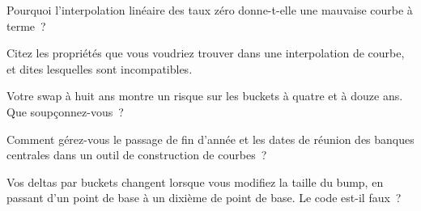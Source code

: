 \begin{interviewq}\label{iq:rc:curve-construction:2}
Pourquoi l'interpolation linéaire des taux zéro donne-t-elle une mauvaise courbe à terme~?
\end{interviewq}

\begin{interviewq}\label{iq:rc:curve-construction:3}
Citez les propriétés que vous voudriez trouver dans une interpolation de courbe, et dites lesquelles
sont incompatibles.
\end{interviewq}

\begin{interviewq}\label{iq:rc:curve-construction:4}
Votre swap à huit ans montre un risque sur les buckets à quatre et à douze ans. Que
soupçonnez-vous~?
\end{interviewq}

\begin{interviewq}\label{iq:rc:curve-construction:5}
Comment gérez-vous le passage de fin d'année et les dates de réunion des banques centrales
dans un outil de construction de courbes~?
\end{interviewq}

\begin{interviewq}\label{iq:rc:curve-construction:6}
Vos deltas par buckets changent lorsque vous modifiez la taille du bump, en passant d'un point de base
à un dixième de point de base. Le code est-il faux~?
\end{interviewq}
